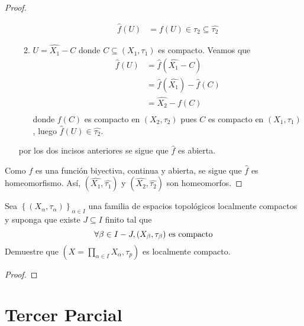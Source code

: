 \documentclass[12pt]{report}
\theoremstyle{largebreak}
\begin{document}
\begin{proof}
\begin{itemize}
\begin{enumerate}
                \begin{equation*}
                    \begin{split}
                        \hat{f}(U)&=f(U)\in\tau_2\subseteq\hat{\tau_2}
                    \end{split}
                \end{equation*}
                \item $U=\hat{X_1}-C$ donde $C\subseteq (X_1,\tau_1)$ es compacto. Veamos que
                \begin{equation*}
                    \begin{split}
                        \hat{f}(U)&=\hat{f}(\hat{X_1}-C)\\
                        &=\hat{f}(\hat{X_1})-\hat{f}(C)\\
                        &=\hat{X_2}-f(C)\\
                    \end{split}
                \end{equation*}
                donde $f(C)$ es compacto en $(X_2,\tau_2)$ pues $C$ es compacto en $(X_1,\tau_1)$, luego $\hat{f}(U)\in\hat{\tau_2}$.
            \end{enumerate}
            por los dos incisos anteriores se sigue que $\hat{f}$ es abierta.
        \end{itemize}
        Como $f$ es una función biyectiva, continua y abierta, se sigue que $\hat{f}$ es homeomorfismo. Así, $(\hat{X_1},\hat{\tau_1})$ y $(\hat{X_2},\hat{\tau_2})$ son homeomorfos.
    \end{proof}

    \begin{excer}
        Sea $\left\{(X_\alpha,\tau_\alpha) \right\}_{\alpha\in I}$ una familia de espacios topológicos localmente compactos y suponga que existe $J\subseteq I$ finito tal que
        \begin{equation*}
            \forall \beta\in I-J, (X_\beta,\tau_\beta)\textup{ es compacto}
        \end{equation*}
        Demuestre que $\left(X=\prod_{\alpha\in I}X_\alpha,\tau_p \right)$ es localmente compacto.
    \end{excer}

    \begin{proof}
        
    \end{proof}

    \chapter{Tercer Parcial}
\end{document}

